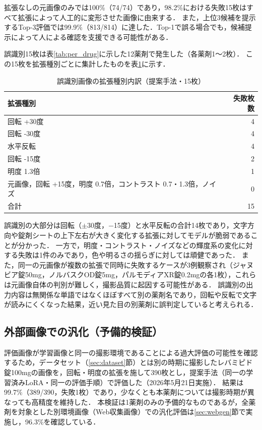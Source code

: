 \documentclass[dvipdfmx]{jsarticle}
\begin{document}
拡張なしの元画像のみでは100\%（74/74）であり，98.2\%における失敗15枚はすべて拡張によって人工的に変形させた画像に由来する．
また，上位3候補を提示するTop-3評価では99.9\%（813/814）に達した．Top-1で誤る場合でも，候補提示によって人による確認を支援できる可能性がある．

誤識別15枚は表\ref{tab:per_drug}に示した12薬剤で発生した（各薬剤1〜2枚）．
この15枚を拡張種別ごとに集計したものを表\ref{tab:failed_aug}に示す．

\begin{table}[htbp]
\centering
\caption{誤識別画像の拡張種別内訳（提案手法・15枚）}
\label{tab:failed_aug}
\begin{tabular}{lr}
\hline
拡張種別 & 失敗枚数 \\
\hline
回転 +30度 & 4 \\
回転 -30度 & 4 \\
水平反転 & 4 \\
回転 -15度 & 2 \\
明度 1.3倍 & 1 \\
元画像，回転 +15度，明度 0.7倍，コントラスト 0.7・1.3倍，ノイズ & 0 \\
\hline
合計 & 15 \\
\hline
\end{tabular}
\end{table}

誤識別の大部分は回転（$\pm$30度，$-$15度）と水平反転の合計14枚であり，文字方向や錠剤シートの上下左右が大きく変化する拡張に対してモデルが脆弱であることが分かった．
一方で，明度・コントラスト・ノイズなどの輝度系の変化に対する失敗は1件のみであり，色や明るさの揺らぎに対しては頑健であった．
また，同一の元画像が複数の拡張で同時に失敗するケースが3例観察され（ジャヌビア錠50mg，ノルバスクOD錠5mg，パルモディアXR錠0.2mgの各1枚），これらは元画像自体の判別が難しく，撮影品質に起因する可能性がある．
誤識別の出力内容は無関係な単語ではなくほぼすべて別の薬剤名であり，回転や反転で文字が読みにくくなった結果，近い見た目の別薬剤に誤判定していると考えられる．

\subsection{外部画像での汎化（予備的検証）}

評価画像が学習画像と同一の撮影環境であることによる過大評価の可能性を確認するため，データセット（\ref{sec:dataset}節）とは別の時期に撮影したレバミピド錠100mgの画像を，回転・明度の拡張を施して390枚とし，提案手法（同一の学習済みLoRA・同一の評価手順）で評価した（2026年5月21日実施）．
結果は99.7\%（389/390，失敗1枚）であり，少なくとも本薬剤については撮影時期が異なっても高精度を維持した．
本検証は1薬剤のみの予備的なものであるが，全薬剤を対象とした別環境画像（Web収集画像）での汎化評価は\ref{sec:webgen}節で実施し，96.3\%を確認している．
\end{document}
